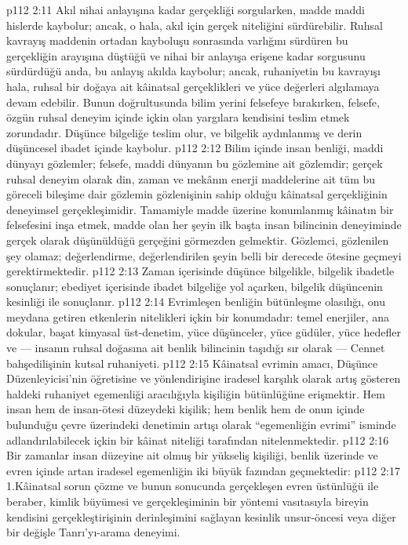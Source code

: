 \vs p112 2:11 Akıl nihai anlayışına kadar gerçekliği sorgularken, madde maddi hislerde kaybolur; ancak, o hala, akıl için gerçek niteliğini sürdürebilir. Ruhsal kavrayış maddenin ortadan kayboluşu sonrasında varlığını sürdüren bu gerçekliğin arayışına düştüğü ve nihai bir anlayışa erişene kadar sorgusunu sürdürdüğü anda, bu anlayış akılda kaybolur; ancak, ruhaniyetin bu kavrayışı hala, ruhsal bir doğaya ait kâinatsal gerçeklikleri ve yüce değerleri algılamaya devam edebilir. Bunun doğrultusunda bilim yerini felsefeye bırakırken, felsefe, özgün ruhsal deneyim içinde içkin olan yargılara kendisini teslim etmek zorundadır. Düşünce bilgeliğe teslim olur, ve bilgelik aydınlanmış ve derin düşüncesel ibadet içinde kaybolur.
\vs p112 2:12 Bilim içinde insan benliği, maddi dünyayı gözlemler; felsefe, maddi dünyanın bu gözlemine ait gözlemdir; gerçek ruhsal deneyim olarak din, zaman ve mekânın enerji maddelerine ait tüm bu göreceli bileşime dair gözlemin gözlenişinin sahip olduğu kâinatsal gerçekliğinin deneyimsel gerçekleşimidir. Tamamiyle madde üzerine konumlanmış kâinatın bir felsefesini inşa etmek, madde olan her şeyin ilk başta insan bilincinin deneyiminde gerçek olarak düşünüldüğü gerçeğini görmezden gelmektir. Gözlemci, gözlenilen şey olamaz; değerlendirme, değerlendirilen şeyin belli bir derecede ötesine geçmeyi gerektirmektedir.
\vs p112 2:13 Zaman içerisinde düşünce bilgelikle, bilgelik ibadetle sonuçlanır; ebediyet içerisinde ibadet bilgeliğe yol açarken, bilgelik düşüncenin kesinliği ile sonuçlanır.
\vs p112 2:14 Evrimleşen benliğin bütünleşme olasılığı, onu meydana getiren etkenlerin nitelikleri içkin bir konumdadır: temel enerjiler, ana dokular, başat kimyasal üst\hyp{}denetim, yüce düşünceler, yüce güdüler, yüce hedefler ve --- insanın ruhsal doğasına ait benlik bilincinin taşıdığı sır olarak --- Cennet bahşedilişinin kutsal ruhaniyeti.
\vs p112 2:15 Kâinatsal evrimin amacı, Düşünce Düzenleyicisi’nin öğretisine ve yönlendirişine iradesel karşılık olarak artış gösteren haldeki ruhaniyet egemenliği aracılığıyla kişiliğin bütünlüğüne erişmektir. Hem insan hem de insan\hyp{}ötesi düzeydeki kişilik; hem benlik hem de onun içinde bulunduğu çevre üzerindeki denetimin artışı olarak “egemenliğin evrimi” isminde adlandırılabilecek içkin bir kâinat niteliği tarafından nitelenmektedir.
\vs p112 2:16 Bir zamanlar insan düzeyine ait olmuş bir yükseliş kişiliği, benlik üzerinde ve evren içinde artan iradesel egemenliğin iki büyük fazından geçmektedir:
\vs p112 2:17 1.\bibnobreakspace Kâinatsal sorun çözme ve bunun sonucunda gerçekleşen evren üstünlüğü ile beraber, kimlik büyümesi ve gerçekleşiminin bir yöntemi vasıtasıyla bireyin kendisini gerçekleştirişinin derinleşimini sağlayan kesinlik unsur\hyp{}öncesi veya diğer bir değişle Tanrı’yı\hyp{}arama deneyimi.
